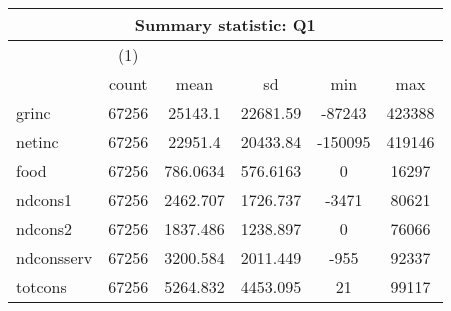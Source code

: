 \begin{tabular}{l*{1}{ccccc}}
\hline\hline
\multicolumn{6}{c}{Summary statistic: Q1}  \\
\hline
            &\multicolumn{1}{c}{(1)}&            &            &            &            \\
            &       count&        mean&          sd&         min&         max\\
\hline
grinc       &       67256&     25143.1&    22681.59&      -87243&      423388\\
netinc      &       67256&     22951.4&    20433.84&     -150095&      419146\\
food        &       67256&    786.0634&    576.6163&           0&       16297\\
ndcons1     &       67256&    2462.707&    1726.737&       -3471&       80621\\
ndcons2     &       67256&    1837.486&    1238.897&           0&       76066\\
ndconsserv  &       67256&    3200.584&    2011.449&        -955&       92337\\
totcons     &       67256&    5264.832&    4453.095&          21&       99117\\
\hline\hline
\end{tabular}
